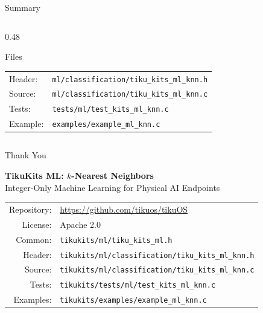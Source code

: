 \documentclass[aspectratio=169, 10pt]{beamer}
\begin{document}
\begin{frame}{Summary}
\begin{columns}[T]
\begin{column}{0.48\textwidth}
\begin{block}{Files}
\scriptsize
\begin{tabular}{@{}lp{4.5cm}@{}}
Header: & \texttt{ml/classification/tiku\_kits\_ml\_knn.h} \\
Source: & \texttt{ml/classification/tiku\_kits\_ml\_knn.c} \\
Tests: & \texttt{tests/ml/test\_kits\_ml\_knn.c} \\
Example: & \texttt{examples/example\_ml\_knn.c} \\
\end{tabular}
\end{block}
\end{column}
\end{columns}
\end{frame}

\begin{frame}{Thank You}
\begin{center}
\Large\textbf{TikuKits ML: $k$-Nearest Neighbors}\\[0.5em]
\normalsize Integer-Only Machine Learning for Physical AI Endpoints\\[1.5em]

\begin{tabular}{rl}
  Repository: & \url{https://github.com/tikuos/tikuOS} \\
  License:    & Apache 2.0 \\
  Common:     & \texttt{tikukits/ml/tiku\_kits\_ml.h} \\
  Header:     & \texttt{tikukits/ml/classification/tiku\_kits\_ml\_knn.h} \\
  Source:     & \texttt{tikukits/ml/classification/tiku\_kits\_ml\_knn.c} \\
  Tests:      & \texttt{tikukits/tests/ml/test\_kits\_ml\_knn.c} \\
  Examples:   & \texttt{tikukits/examples/example\_ml\_knn.c} \\
\end{tabular}
\end{center}
\end{frame}
\end{document}
